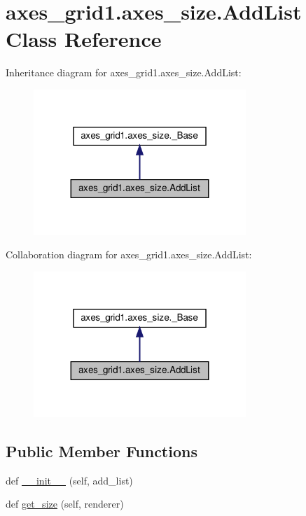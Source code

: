 \hypertarget{classaxes__grid1_1_1axes__size_1_1AddList}{}\section{axes\+\_\+grid1.\+axes\+\_\+size.\+Add\+List Class Reference}
\label{classaxes__grid1_1_1axes__size_1_1AddList}


Inheritance diagram for axes\+\_\+grid1.\+axes\+\_\+size.\+Add\+List\+:
\nopagebreak
\begin{figure}[H]
\begin{center}
\leavevmode
\includegraphics[width=227pt]{classaxes__grid1_1_1axes__size_1_1AddList__inherit__graph}
\end{center}
\end{figure}


Collaboration diagram for axes\+\_\+grid1.\+axes\+\_\+size.\+Add\+List\+:
\nopagebreak
\begin{figure}[H]
\begin{center}
\leavevmode
\includegraphics[width=227pt]{classaxes__grid1_1_1axes__size_1_1AddList__coll__graph}
\end{center}
\end{figure}
\subsection*{Public Member Functions}
\begin{DoxyCompactItemize}
\item 
def \hyperlink{classaxes__grid1_1_1axes__size_1_1AddList_a902b101da315afd1a6384a7e38c46e23}{\+\_\+\+\_\+init\+\_\+\+\_\+} (self, add\+\_\+list)
\item 
def \hyperlink{classaxes__grid1_1_1axes__size_1_1AddList_a8f1d4e70a4aaa08ca76559390de9a34e}{get\+\_\+size} (self, renderer)
\end{DoxyCompactItemize}



